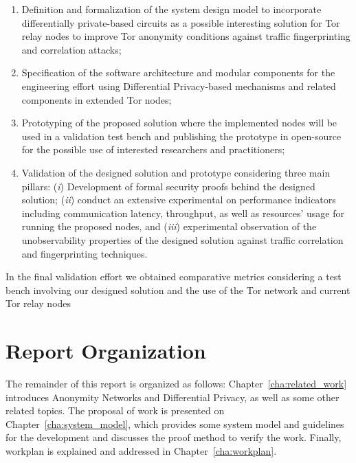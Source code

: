 \begin{enumerate}
    \item Definition and formalization of the system design model to incorporate differentially private-based circuits as a possible interesting solution for Tor relay nodes to improve Tor anonymity conditions against traffic fingerprinting and correlation attacks;

    \item Specification of the software architecture and modular components for the engineering effort using Differential Privacy-based mechanisms and related components in extended Tor nodes;
   
    \item Prototyping of the proposed solution where the implemented nodes will be used in a validation test bench and publishing the prototype in open-source for the possible use of interested researchers and practitioners;
   
    \item Validation of the designed solution and prototype considering three main pillars: (\emph{i}) Development of formal security proofs behind the designed solution; (\emph{ii}) conduct an extensive experimental on performance indicators including communication latency, throughput, as well as resources' usage for running the proposed nodes, and (\emph{iii}) experimental observation of the unobservability properties of the designed solution against traffic correlation and fingerprinting techniques. 
   
\end{enumerate}

In the final validation effort we obtained comparative metrics considering a test bench involving our designed solution and the use of the Tor network and current Tor relay nodes


\section{Report Organization}\label{sec:report_organization}
The remainder of this report is organized as follows: Chapter~\ref{cha:related_work} introduces Anonymity Networks and Differential Privacy, as well as some other related topics. The proposal of work is presented on Chapter~\ref{cha:system_model}, which provides some system model and guidelines for the development and discusses the proof method to verify the work. Finally, workplan is explained and addressed in Chapter~\ref{cha:workplan}.